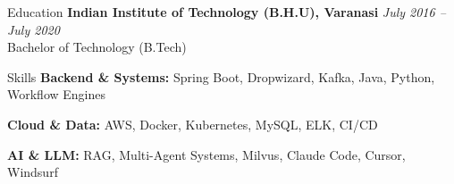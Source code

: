 \documentclass[10pt,letterpaper]{resume}
\begin{document}

\begin{rSection}{Education}
{\bf Indian Institute of Technology (B.H.U), Varanasi} \hfill {\em July 2016 -- July 2020} \\
Bachelor of Technology (B.Tech)
\end{rSection}


\begin{rSection}{Skills}
{\bf Backend \& Systems:} Spring Boot, Dropwizard, Kafka, Java, Python, Workflow Engines \par
{\bf Cloud \& Data:} AWS, Docker, Kubernetes, MySQL, ELK, CI/CD \par
{\bf AI \& LLM:} RAG, Multi-Agent Systems, Milvus, Claude Code, Cursor, Windsurf
\end{rSection}

\end{document}
